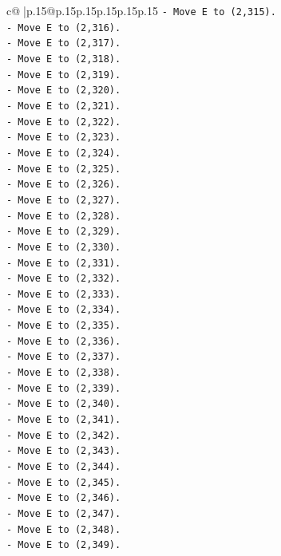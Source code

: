 \documentclass{article}
\begin{document}
{\begin{supertabular}{c@{$\;$}|p{.15\linewidth}@{}p{.15\linewidth}p{.15\linewidth}p{.15\linewidth}p{.15\linewidth}p{.15\linewidth}}
{{{\texttt{{-} Move E to (2,315).} \\
\texttt{{-} Move E to (2,316).} \\
\texttt{{-} Move E to (2,317).} \\
\texttt{{-} Move E to (2,318).} \\
\texttt{{-} Move E to (2,319).} \\
\texttt{{-} Move E to (2,320).} \\
\texttt{{-} Move E to (2,321).} \\
\texttt{{-} Move E to (2,322).} \\
\texttt{{-} Move E to (2,323).} \\
\texttt{{-} Move E to (2,324).} \\
\texttt{{-} Move E to (2,325).} \\
\texttt{{-} Move E to (2,326).} \\
\texttt{{-} Move E to (2,327).} \\
\texttt{{-} Move E to (2,328).} \\
\texttt{{-} Move E to (2,329).} \\
\texttt{{-} Move E to (2,330).} \\
\texttt{{-} Move E to (2,331).} \\
\texttt{{-} Move E to (2,332).} \\
\texttt{{-} Move E to (2,333).} \\
\texttt{{-} Move E to (2,334).} \\
\texttt{{-} Move E to (2,335).} \\
\texttt{{-} Move E to (2,336).} \\
\texttt{{-} Move E to (2,337).} \\
\texttt{{-} Move E to (2,338).} \\
\texttt{{-} Move E to (2,339).} \\
\texttt{{-} Move E to (2,340).} \\
\texttt{{-} Move E to (2,341).} \\
\texttt{{-} Move E to (2,342).} \\
\texttt{{-} Move E to (2,343).} \\
\texttt{{-} Move E to (2,344).} \\
\texttt{{-} Move E to (2,345).} \\
\texttt{{-} Move E to (2,346).} \\
\texttt{{-} Move E to (2,347).} \\
\texttt{{-} Move E to (2,348).} \\
\texttt{{-} Move E to (2,349).} \\
}}}
\end{supertabular}}
\end{document}
